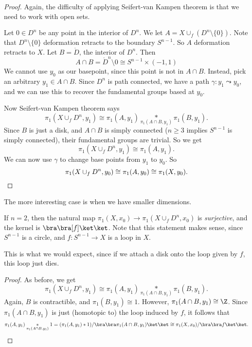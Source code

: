 \documentclass[a4paper]{article}
\begin{document}
\begin{proof}
  Again, the difficulty of applying Seifert-van Kampen theorem is that we need to work with open sets.

  Let $0 \in D^n$ be any point in the interior of $D^n$. We let $A = X\cup_f (D^n \setminus \{0\})$. Note that $D^n \setminus \{0\}$ deformation retracts to the boundary $S^{n - 1}$. So $A$ deformation retracts to $X$. Let $B = \mathring{D}$, the interior of $D^n$. Then
  \[
    A\cap B = \mathring{D}^n \setminus 0 \cong S^{n - 1}\times (-1, 1)
  \]
  We cannot use $y_0$ as our basepoint, since this point is not in $A\cap B$. Instead, pick an arbitrary $y_1 \in A\cap B$. Since $D^n$ is path connected, we have a path $\gamma: y_1 \leadsto y_0$, and we can use this to recover the fundamental groups based at $y_0$.

  Now Seifert-van Kampen theorem says
  \[
    \pi_1(X\cup_f D^n, y_1) \cong \pi_1(A, y_1) \underset{\pi_1(A\cap B, y_1)}{*} \pi_1(B, y_1).
  \]
  Since $B$ is just a disk, and $A\cap B$ is simply connected ($n \geq 3$ implies $S^{n - 1}$ is simply connected), their fundamental groups are trivial. So we get
  \[
    \pi_1(X\cup_f D^n, y_1) \cong \pi_1(A, y_1).
  \]
  We can now use $\gamma$ to change base points from $y_1$ to $y_0$. So
  \[
    \pi_1(X\cup_f D^n, y_0) \cong \pi_1(A, y_0) \cong \pi_1(X, y_0).\qedhere
  \]
\end{proof}
The more interesting case is when we have smaller dimensions.
\begin{thm}
  If $n = 2$, then the natural map $\pi_1(X, x_0) \to \pi_1(X\cup_f D^n, x_0)$ is \emph{surjective}, and the kernel is $\bra\bra [f] \ket \ket$. Note that this statement makes sense, since $S^{n - 1}$ is a circle, and $f: S^{n - 1} \to X$ is a loop in $X$.
\end{thm}
This is what we would expect, since if we attach a disk onto the loop given by $f$, this loop just dies.

\begin{proof}
  As before, we get
  \[
    \pi_1(X\cup_f D^n, y_1) \cong \pi_1(A, y_1) \underset{\pi_1(A\cap B, y_1)}{*} \pi_1(B, y_1).
  \]
  Again, $B$ is contractible, and $\pi_1(B, y_1) \cong 1$. However, $\pi_1(A\cap B, y_1) \cong \Z$. Since $\pi_1(A\cap B, y_1)$ is just (homotopic to) the loop induced by $f$, it follows that
  \[
    \pi_1(A, y_1) \underset{\pi_1(A\cap B, y_1)}{*} 1 = (\pi_1(A, y_1) * 1)/\bra \bra \pi_1(A\cap B, y_1)\ket \ket \cong \pi_1(X, x_0)/\bra \bra f\ket\ket.\qedhere
  \]
\end{proof}
\end{document}
